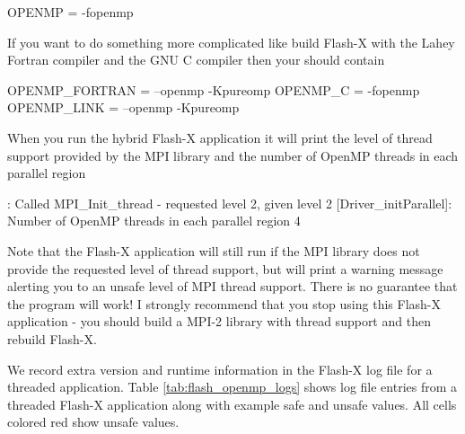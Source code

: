 \begin{codeseg}
OPENMP = -fopenmp
\end{codeseg}

If you want to do something more complicated like build Flash-X with the
Lahey Fortran compiler  and the GNU C compiler 
then your  should contain

\begin{codeseg}
OPENMP_FORTRAN = --openmp -Kpureomp
OPENMP_C = -fopenmp
OPENMP_LINK = --openmp -Kpureomp
\end{codeseg}

When you run the hybrid Flash-X application it will print the level of
thread support provided by the MPI library and the number of OpenMP
threads in each parallel region

\begin{codeseg}
: Called MPI_Init_thread - requested level   2, given level   2
[Driver_initParallel]: Number of OpenMP threads in each parallel region  4
\end{codeseg}

Note that the Flash-X application will still run if the MPI library does
not provide the requested level of thread support, but will print a
warning message alerting you to an unsafe level of MPI thread support.
There is no guarantee that the program will work!  I strongly
recommend that you stop using this Flash-X application - you should
build a MPI-2 library with thread support and then rebuild Flash-X.

We record extra version and runtime information in the Flash-X log file
for a threaded application.  Table \ref{tab:flash_openmp_logs} shows
log file entries from a threaded Flash-X application along with example
safe and unsafe values.  All cells colored red show unsafe values.

